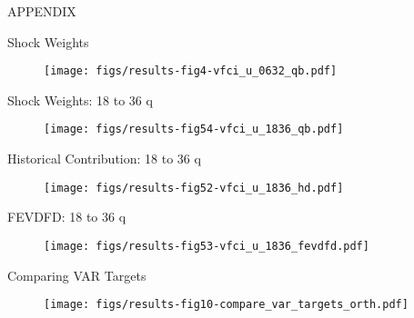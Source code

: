 \begin{frame}
  \frametitle{}
  \centering
  \Huge
  APPENDIX
\end{frame}

\begin{frame}{Shock Weights}

  \begin{figure}
    \texttt{[image: figs/results-fig4-vfci\_u\_0632\_qb.pdf]}
  \end{figure}

\end{frame}


\begin{frame}{Shock Weights: 18 to 36 q}

  \begin{figure}
    \texttt{[image: figs/results-fig54-vfci\_u\_1836\_qb.pdf]}
  \end{figure}

\end{frame}



\begin{frame}{Historical Contribution: 18 to 36 q}

  \begin{figure}
    \texttt{[image: figs/results-fig52-vfci\_u\_1836\_hd.pdf]}
  \end{figure}

\end{frame}


\begin{frame}{FEVDFD: 18 to 36 q}

  \begin{figure}
    \texttt{[image: figs/results-fig53-vfci\_u\_1836\_fevdfd.pdf]}
  \end{figure}

\end{frame}


\begin{frame}{Comparing VAR Targets}

  \begin{figure}
    \texttt{[image: figs/results-fig10-compare\_var\_targets\_orth.pdf]}
  \end{figure}

\end{frame}



